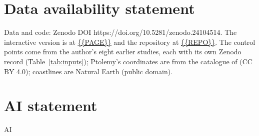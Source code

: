 \documentclass[11pt,a4paper]{article}
\begin{document}
\section*{Data availability statement}
Data and code: Zenodo DOI https://doi.org/10.5281/zenodo.24104514. The interactive version is at \url{{{PAGE}}} and the repository at \url{{{REPO}}}. The control points come from the author's eight earlier studies, each with its own Zenodo record (Table~\ref{tab:inputs}); Ptolemy's coordinates are from the catalogue of \citet{grasshoff2019} (CC BY 4.0); coastlines are Natural Earth (public domain).

\section*{AI statement}
{{AI}}
\end{document}
